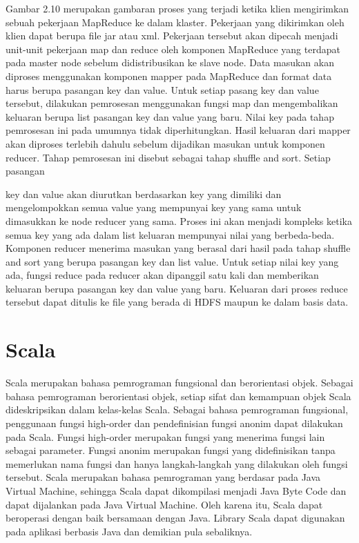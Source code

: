 \begin{itemize}
{	Gambar 2.10 merupakan gambaran proses yang terjadi ketika klien mengirimkan sebuah pekerjaan
	MapReduce ke dalam klaster. Pekerjaan yang dikirimkan oleh klien dapat berupa file jar atau
	xml. Pekerjaan tersebut akan dipecah menjadi unit-unit pekerjaan map dan reduce oleh komponen
	MapReduce yang terdapat pada master node sebelum didistribusikan ke slave node.
	Data masukan akan diproses menggunakan komponen mapper pada MapReduce dan format
	data harus berupa pasangan key dan value. Untuk setiap pasang key dan value tersebut, dilakukan
	pemrosesan menggunakan fungsi map dan mengembalikan keluaran berupa list pasangan key dan
	value yang baru. Nilai key pada tahap pemrosesan ini pada umumnya tidak diperhitungkan.
	Hasil keluaran dari mapper akan diproses terlebih dahulu sebelum dijadikan masukan untuk
	komponen reducer. Tahap pemrosesan ini disebut sebagai tahap shuffle and sort. Setiap pasangan
	
	key dan value akan diurutkan berdasarkan key yang dimiliki dan mengelompokkan semua value yang
	mempunyai key yang sama untuk dimasukkan ke node reducer yang sama. Proses ini akan menjadi
	kompleks ketika semua key yang ada dalam list keluaran mempunyai nilai yang berbeda-beda.
	Komponen reducer menerima masukan yang berasal dari hasil pada tahap shuffle and sort yang
	berupa pasangan key dan list value. Untuk setiap nilai key yang ada, fungsi reduce pada reducer
	akan dipanggil satu kali dan memberikan keluaran berupa pasangan key dan value yang baru.
	Keluaran dari proses reduce tersebut dapat ditulis ke file yang berada di HDFS maupun ke dalam
	basis data.
	}
\end{itemize}
\label{sec:Hadoop}

\section{Scala}
Scala merupakan bahasa pemrograman fungsional dan berorientasi objek. Sebagai bahasa pemrograman
berorientasi objek, setiap sifat dan kemampuan objek Scala dideskripsikan dalam
kelas-kelas Scala. Sebagai bahasa pemrograman fungsional, penggunaan fungsi high-order dan
pendefinisian fungsi anonim dapat dilakukan pada Scala. Fungsi high-order merupakan fungsi yang
menerima fungsi lain sebagai parameter. Fungsi anonim merupakan fungsi yang didefinisikan tanpa
memerlukan nama fungsi dan hanya langkah-langkah yang dilakukan oleh fungsi tersebut.
Scala merupakan bahasa pemrograman yang berdasar pada Java Virtual Machine, sehingga
Scala dapat dikompilasi menjadi Java Byte Code dan dapat dijalankan pada Java Virtual Machine.
Oleh karena itu, Scala dapat beroperasi dengan baik bersamaan dengan Java. Library Scala dapat
digunakan pada aplikasi berbasis Java dan demikian pula sebaliknya.

